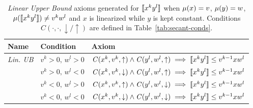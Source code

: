 \begin{table}[ht]
	\centering
	\setlength{\tabcolsep}{1.2em}
	\renewcommand{\arraystretch}{1.3}
	\begin{tabular}{@{}lll@{}}
		\hline
		\textbf{Name}    & \textbf{Condition}        & \textbf{Axiom}                                                                                          \\
		\hline
		\textit{Lin. UB} & $v^k > 0, \,w^l > 0$ & $\mathit{C}(x^k, v^k,\uparrow) \land \mathit{C}(y^l, w^l,\uparrow) \implies \llbracket x^k y^l \rrbracket \leq v^{k-1}xw^l$     \\
		                 & $v^k > 0, \,w^l < 0$ & $\mathit{C}(x^k, v^k,\downarrow) \land \mathit{C}(y^l, w^l,\uparrow) \implies \llbracket x^k y^l \rrbracket \leq v^{k-1}xw^l$   \\
		                 & $v^k < 0, \,w^l > 0$ & $\mathit{C}(x^k, v^k,\uparrow) \land \mathit{C}(y^l, w^l,\downarrow) \implies \llbracket x^k y^l \rrbracket \leq v^{k-1}xw^l$   \\
		                 & $v^k < 0, \,w^l < 0$ & $\mathit{C}(x^k, v^k,\downarrow) \land \mathit{C}(y^l, w^l,\downarrow) \implies \llbracket x^k y^l \rrbracket \leq v^{k-1}xw^l$ \\
		\hline
	\end{tabular}
	\vspace{0.9em}
	\caption{%
		\textit{Linear Upper Bound} axioms generated for $\llbracket x^k y^l \rrbracket$ when $\mu(x)=v$, $\mu(y)=w$, $\mu(\llbracket x^k y^l \rrbracket)\neq v^kw^l$ and
		$x$ is linearized while $y$ is kept constant.
		Conditions $\mathit{C}(\cdot,\cdot,\downarrow/\uparrow)$ are defined in Table~\ref{tab:secant-conds}.\label{tab:mul-axioms-ub}}
\end{table}
